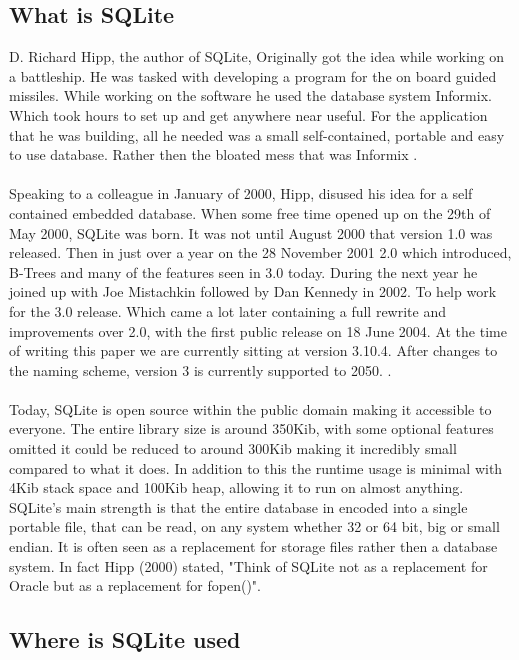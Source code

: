 \subsection{What is SQLite}
\label{subsec:what_is_sqlite}

D. Richard Hipp, the author of SQLite, Originally got the idea while working on a battleship. He was tasked with developing a program for the on board guided missiles. While working on the software he used the database system Informix. Which took hours to set up and get anywhere near useful. For the application that he was building, all he needed was a small self-contained, portable and easy to use database. Rather then the bloated mess that was Informix \citep{sqlitedefguide}.
\\\\
Speaking to a colleague in January of 2000, Hipp, disused his idea for a self contained embedded database. When some free time opened up on the 29th of May 2000, SQLite was born. It was not until August 2000 that version 1.0 was released. Then in just over a year on the 28 November 2001 2.0 which introduced, B-Trees and many of the features seen in 3.0 today. During the next year he joined up with Joe Mistachkin followed by Dan Kennedy in 2002. To help work for the 3.0 release. Which came a lot later containing a full rewrite and improvements over 2.0, with the first public release on 18 June 2004. At the time of writing this paper we are currently sitting at version 3.10.4. After changes to the naming scheme, version 3 is currently supported to 2050. \citep{sqlite}.
\\\\
Today, SQLite is open source within the public domain making it accessible to everyone. The entire library size is around 350Kib, with some optional features omitted it could be reduced to around 300Kib making it incredibly small compared to what it does. In addition to this the runtime usage is minimal with 4Kib stack space and 100Kib heap, allowing it to run on almost anything. SQLite's main strength is that the entire database in encoded into a single portable file, that can be read, on any system whether 32 or 64 bit, big or small endian. It is often seen as a replacement for storage files rather then a database system. In fact Hipp (2000) stated, "Think of SQLite not as a replacement for Oracle but as a replacement for fopen()".

\subsection{Where is SQLite used}
\label{subsec:where_is_sqlite}

